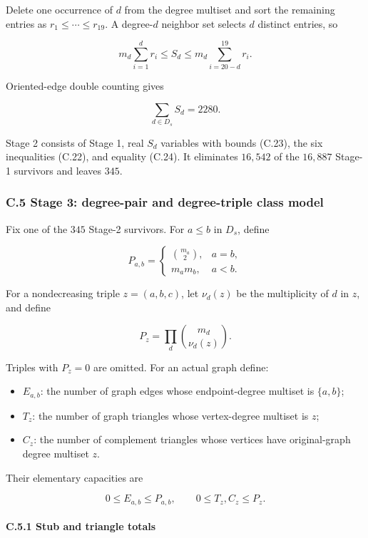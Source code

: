 \documentclass[
  english,
  11pt,
  a4paper,
]{article}
\providecommand{\tightlist}{%
  \setlength{\itemsep}{0pt}\setlength{\parskip}{0pt}}
\begin{document}
Delete one occurrence of \(d\) from the degree multiset and sort the
remaining entries as \(r_1\le\cdots\le r_{19}\). A degree-\(d\) neighbor
set selects \(d\) distinct entries, so

\[
m_d\sum_{i=1}^{d}r_i
\le S_d\le
m_d\sum_{i=20-d}^{19}r_i.
\tag{C.23}
\]

Oriented-edge double counting gives

\[
\sum_{d\in D_s}S_d=2280.
\tag{C.24}
\]

Stage 2 consists of Stage 1, real \(S_d\) variables with bounds (C.23),
the six inequalities (C.22), and equality (C.24). It eliminates
\(16{,}542\) of the \(16{,}887\) Stage-1 survivors and leaves \(345\).

\subsubsection{C.5 Stage 3: degree-pair and degree-triple class
model}\label{c.5-stage-3-degree-pair-and-degree-triple-class-model}

Fix one of the \(345\) Stage-2 survivors. For \(a\le b\) in \(D_s\),
define

\[
P_{a,b}=
\begin{cases}
\binom{m_a}{2},&a=b,\\
m_am_b,&a<b.
\end{cases}
\tag{C.25}
\]

For a nondecreasing triple \(z=(a,b,c)\), let \(\nu_d(z)\) be the
multiplicity of \(d\) in \(z\), and define

\[
P_z=\prod_d\binom{m_d}{\nu_d(z)}.
\tag{C.26}
\]

Triples with \(P_z=0\) are omitted. For an actual graph define:

\begin{itemize}
\tightlist
\item
  \(E_{a,b}\): the number of graph edges whose endpoint-degree multiset
  is \(\{a,b\}\);
\item
  \(T_z\): the number of graph triangles whose vertex-degree multiset is
  \(z\);
\item
  \(C_z\): the number of complement triangles whose vertices have
  original-graph degree multiset \(z\).
\end{itemize}

Their elementary capacities are

\[
0\le E_{a,b}\le P_{a,b},\qquad
0\le T_z,C_z\le P_z.
\tag{C.27}
\]

\paragraph{C.5.1 Stub and triangle
totals}\label{c.5.1-stub-and-triangle-totals}
\end{document}

